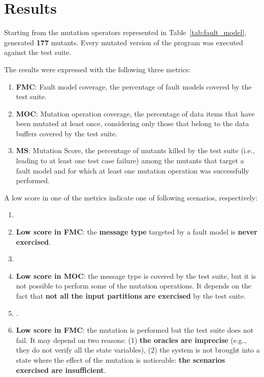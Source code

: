 
\chapter{Results}


Starting from the mutation operators represented in Table~\ref{tab:fault_model}, \DAMA generated \textbf{177} mutants. Every mutated version of the program was executed against the \case test suite.

The results were expressed with the following three metrics:
\begin{enumerate}
\item \textbf{FMC}: Fault model coverage, the percentage of fault models covered by the test suite.
\item \textbf{MOC}: Mutation operation coverage, the percentage of data items that have been mutated at least once, considering only those that belong to the data buffers covered by the test suite.
\item \textbf{MS}: Mutation Score, the percentage of mutants killed by the test suite (i.e., leading to at least one test case failure) among the mutants that target a fault model and for which at least one mutation operation was successfully performed.
\end{enumerate}

A low score in one of the metrics indicate one of following scenarios, respectively:
\begin{enumerate}
\item {}
\item \textbf{Low score in FMC}: the \textbf{message type} targeted by a fault model is \textbf{never exercised}.
\item {}
\item \textbf{Low score in MOC}: the message type is covered by the test suite, but it is not possible to perform some of the mutation operations. It depends on the fact that \textbf{not all the input partitions} \textbf{are exercised} by the test suite.
\item {}.
\item \textbf{Low score in FMC}: the mutation is performed but the test suite does not fail. It may depend on two reasons: (1) \textbf{the oracles are imprecise} (e.g., they do not verify all the state variables), (2) the system is not brought into a state where the effect of the mutation is noticeable: \textbf{the scenarios exercised are insufficient}.
\end{enumerate}

